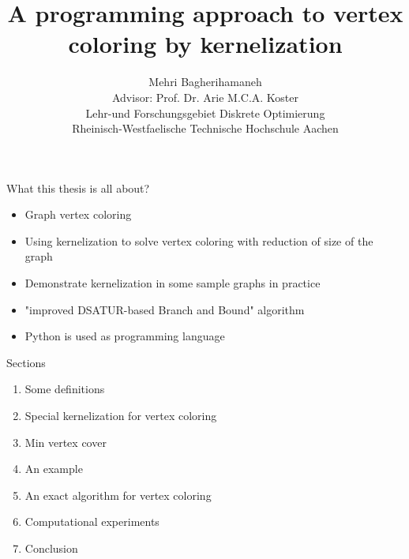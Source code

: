 \documentclass{beamer}
\title{A programming approach to vertex coloring by kernelization}
\author{{Mehri Bagherihamaneh}\\[1cm]{\small {Advisor: Prof. Dr. Arie M.C.A. Koster}}\\[.5cm]{\small {Lehr-und Forschungsgebiet Diskrete Optimierung}}\\ {\small {Rheinisch-Westfaelische Technische Hochschule Aachen}}}
\begin{document}
\begin{frame}
  \titlepage
\end{frame}


\begin{frame}{What this thesis is all about?}
\begin{itemize}

\item Graph vertex coloring
 
\item Using kernelization to solve vertex coloring with reduction of size of the  graph
 
\item Demonstrate kernelization in some sample graphs in practice
 
\item "improved DSATUR-based Branch and Bound" algorithm
 
\item Python is used as programming language

\end{itemize}
\end{frame}

\begin{frame}{Sections}


\begin{enumerate}
\item Some definitions
 
\item Special kernelization for vertex coloring
 

\item Min vertex cover
 
\item An example
 
\item An exact algorithm for vertex coloring
 
\item Computational experiments
 
\item Conclusion
\end{enumerate}
\end{frame}
\end{document}
